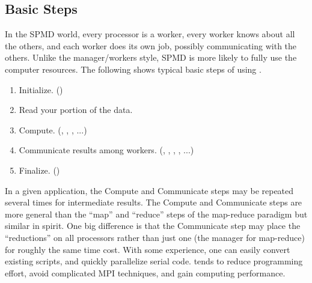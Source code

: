 \subsection[Basic Steps]{Basic Steps}
\label{sec:basic_steps}

In the SPMD world, every processor is a worker, every worker knows
about all the others, and each worker does its own job, possibly
communicating with the others. Unlike the manager/workers style, SPMD
is more likely to fully use the computer resources.  The following
shows typical basic steps of using .
\begin{enumerate}
\item Initialize. ()
\item Read your portion of the data.
\item Compute. (, , , ...)
\item Communicate results among workers.
(, , , , ...)
\item Finalize. ()
\end{enumerate}
In a given application, the Compute and Communicate steps may be
repeated several times for intermediate results. The Compute and
Communicate steps are more general than the ``map'' and ``reduce''
steps of the map-reduce paradigm but similar in spirit.  One big
difference is that the Communicate step may place the ``reductions''
on all processors rather than just one (the manager for map-reduce)
for roughly the same time cost.  With some experience, one can easily
convert existing  scripts, and quickly parallelize serial
code.  tends to reduce programming effort, avoid
complicated MPI techniques, and gain computing performance.

